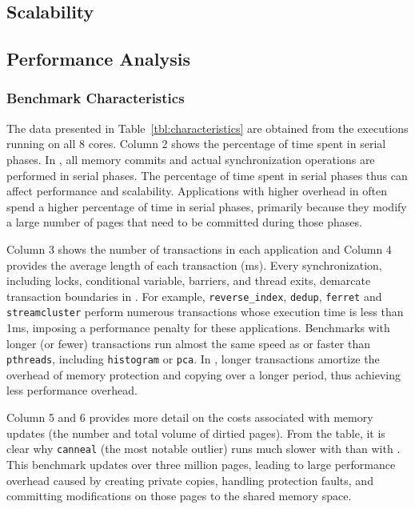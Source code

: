 \subsection{Scalability}



\subsection{Performance Analysis}

\subsubsection{Benchmark Characteristics}

The data presented in Table~\ref{tbl:characteristics} are obtained from the executions running on all 8 cores.  Column 2 shows the percentage of time spent in serial phases.  In \dthreads{}, all memory commits and actual synchronization operations are performed in serial phases.  The percentage of time spent in serial phases thus can affect performance and scalability. Applications with higher overhead in \dthreads{} often spend a higher percentage of time in
serial phases, primarily because they modify a large number of pages that need to be committed during those phases.

Column 3 shows the number of transactions in each application and Column 4 provides the average length of each transaction (ms).  Every synchronization, including locks, conditional variable, barriers, and thread exits, demarcate transaction boundaries in \dthreads{}.  For example, \texttt{reverse\_index}, \texttt{dedup}, \texttt{ferret}
and \texttt{streamcluster} perform numerous transactions whose
execution time is less than 1ms, imposing a performance penalty for these applications.  Benchmarks with longer (or fewer) transactions run almost the same speed as or faster than \texttt{pthreads}, including \texttt{histogram} or \texttt{pca}.  In \dthreads{}, longer transactions amortize the overhead of memory protection and copying over a longer period, thus achieving less performance overhead.

Column 5 and 6 provides more detail on the costs associated with memory updates (the number and total volume of dirtied pages). From the table, it is clear why \texttt{canneal} (the most notable outlier) runs much slower with \dthreads{} than with \pthreads{}. This benchmark updates over three million pages, leading to large performance overhead caused by creating private copies, handling protection faults, and committing modifications on those pages to the shared memory space. 


